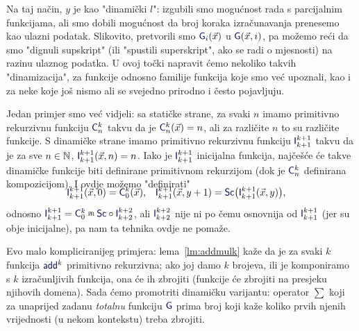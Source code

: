 Na taj način, $y$ je kao "dinamički $l$": izgubili smo mogućnost rada s parcijalnim funkcijama, ali smo dobili mogućnost da broj koraka izračunavanja prenesemo kao ulazni podatak. Slikovito, pretvorili smo $\f G_i(\vec x)$ u $\f G(\vec x,i)$, pa možemo reći da smo "dignuli supskript" (ili "spustili superskript", ako se radi o mjesnosti) na razinu ulaznog podatka. U ovoj točki napravit ćemo nekoliko takvih "dinamizacija", za funkcije odnosno familije funkcija koje smo već upoznali, kao i za neke koje još nismo ali se svejedno prirodno i često pojavljuju.

\begin{primjer}[{name=[koordinantna projekcija kao dinamizacija konstantnih funkcija]}]\label{pr:IdinC}
Jedan primjer smo već vidjeli: sa statičke strane, za svaki $n$ imamo primitivno rekurzivnu funkciju $\f C_n^k$ takvu da je $\f C_n^k(\vec x)=n$, ali za različite $n$ to su različite funkcije. S dinamičke strane imamo primitivno rekurzivnu funkciju $\f I_{k+1}^{k+1}$ takvu da je za sve $n\in{\mathbb N}$, $\f I_{k+1}^{k+1}(\vec x,n)=n$. Iako je $\f I_{k+1}^{k+1}$ inicijalna funkcija, najčešće će takve dinamičke funkcije biti definirane primitivnom rekurzijom (dok je $\f C_n^k$ definirana kompozicijom). I ovdje možemo "definirati"
\begin{align}
\SwapAboveDisplaySkip
    \f I_{k+1}^{k+1}(\vec x,0)&=\f C_0^k(\vec x)\text,&
    \f I_{k+1}^{k+1}(\vec x,y+1)&=\f{Sc}\bigl(\f I_{k+1}^{k+1}(\vec x,y)\bigr)\text,
\end{align}
    odnosno $\f I_{k+1}^{k+1}=\f C_0^k\pr\f{Sc}\circ\f I_{k+2}^{k+2}$, ali $\f I_{k+2}^{k+2}$ nije ni po čemu osnovnija od $\f I_{k+1}^{k+1}$ (jer su obje inicijalne), pa nam ta tehnika ovdje ne pomaže.
\end{primjer}


Evo malo kompliciranijeg primjera: lema~\ref{lm:addmulk} kaže da je za svaki $k$ funkcija $\f{add}^k$ primitivno rekurzivna; ako joj damo $k$ brojeva, ili je komponiramo s $k$ izračunljivih funkcija, ona će ih zbrojiti (funkcije će zbrojiti na presjeku njihovih domena). Sada ćemo promotriti dinamičku varijantu: operator $\sum$ koji za unaprijed zadanu \emph{totalnu} funkciju $\f G$ prima broj koji kaže koliko prvih njenih vrijednosti (u nekom kontekstu) treba zbrojiti. %

